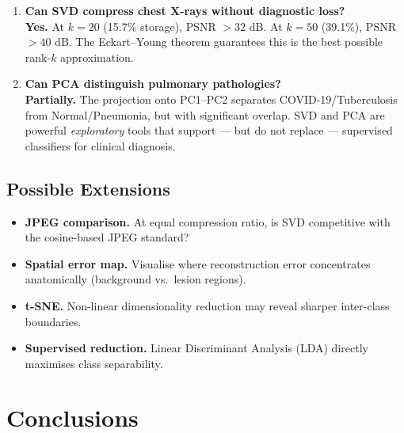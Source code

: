 \documentclass[11pt,a4paper]{article}
\theoremstyle{definition}
\begin{document}
\begin{enumerate}
  \item \textbf{Can SVD compress chest X-rays without diagnostic loss?} \\
    \textbf{Yes.} At $k=20$ (15.7\% storage), PSNR $> 32$ dB. At $k=50$ (39.1\%), PSNR $> 40$ dB. The Eckart--Young theorem guarantees this is the best possible rank-$k$ approximation.

  \item \textbf{Can PCA distinguish pulmonary pathologies?} \\
    \textbf{Partially.} The projection onto PC1--PC2 separates COVID-19/Tuberculosis from Normal/Pneumonia, but with significant overlap. SVD and PCA are powerful \emph{exploratory} tools that support --- but do not replace --- supervised classifiers for clinical diagnosis.
\end{enumerate}

\subsection{Possible Extensions}

\begin{itemize}[nosep]
  \item \textbf{JPEG comparison.} At equal compression ratio, is SVD competitive with the cosine-based JPEG standard?
  \item \textbf{Spatial error map.} Visualise where reconstruction error concentrates anatomically (background vs.\ lesion regions).
  \item \textbf{t-SNE.} Non-linear dimensionality reduction may reveal sharper inter-class boundaries.
  \item \textbf{Supervised reduction.} Linear Discriminant Analysis (LDA) directly maximises class separability.
\end{itemize}

\section*{Conclusions}
\end{document}
